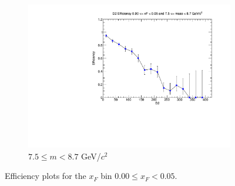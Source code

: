 \documentclass[11pt]{article}
\begin{document}
\begin{figure}[p]
\begin{subfigure}[b]{0.32\textwidth}
        \includegraphics[width=\textwidth]{./kTrackerEfficiencyPlots/D2_Efficiency_xF0_mass10.pdf}
        \caption{$7.5 \leq m < 8.7$ GeV/$c^2$}
    \end{subfigure}
    \caption{Efficiency plots for the $x_F$ bin $0.00 \leq x_F < 0.05$.}
\end{figure}
\end{document}

